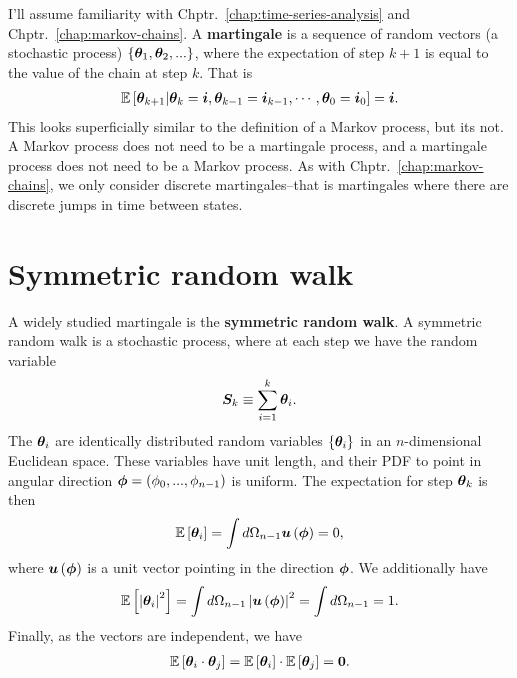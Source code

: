 
I'll assume familiarity with Chptr.~\ref{chap:time-series-analysis} and Chptr.~\ref{chap:markov-chains}.
A \textbf{martingale} is a sequence of random vectors (a stochastic process) $\left\{{\bm \theta}_1,{\bm \theta}_2,...\right\}$, where the expectation of step $k+1$ is equal to the value of the chain at step $k$.
That is
\begin{align}
    \mathbb{E}\left[{\bm \theta}_{k+1}|{\bm \theta}_{k}={\bm i},{\bm \theta}_{k-1}={\bm i}_{k-1},\cdots,{\bm \theta}_0={\bm i}_0\right]
    =
    {\bm i}
    .
\end{align}
This looks superficially similar to the definition of a Markov process, but its not.
A Markov process does not need to be a martingale process, and a martingale process does not need to be a Markov process.
As with Chptr.~\ref{chap:markov-chains}, we only consider discrete martingales--that is martingales where there are discrete jumps in time between states.

\section{Symmetric random walk\label{sec:symmetric-random-walk}}

A widely studied martingale is the \textbf{symmetric random walk}.
A symmetric random walk is a stochastic process, where at each step we have the random variable
\begin{align}
    \label{eq:def-random-walk-vector-sum}
    {\bm S}_k
    \equiv
    \sum_{i=1}^k{\bm \theta}_i
    .
\end{align}
The ${\bm \theta}_i$ are identically distributed random variables $\{{\bm \theta}_i\}$ in an $n$-dimensional Euclidean space.
These variables have unit length, and their PDF to point in angular direction ${\bm \phi}=\left(\phi_0,...,\phi_{n-1}\right)$ is uniform.
The expectation for step ${\bm \theta}_k$ is then
\begin{align}
    \mathbb{E}\left[{\bm \theta}_{i}\right]
    =
    \int d\Omega_{n-1} {\bm u}\left({\bm \phi}\right)
    =
    0
    ,
\end{align}
where ${\bm u}\left({\bm \phi}\right)$ is a unit vector pointing in the direction ${\bm \phi}$.
We additionally have
\begin{align}
    \mathbb{E}\left[\left|{\bm \theta}_i\right|^2\right]
    =
    \int d\Omega_{n-1} \left|{\bm u}\left({\bm \phi}\right)\right|^2
    =
    \int d\Omega_{n-1} 
    =
    1
    .
\end{align}
Finally, as the vectors are independent, we have
\begin{align}
    \mathbb{E}\left[{\bm \theta}_i\cdot{\bm \theta}_j\right]
    =
    \mathbb{E}\left[{\bm \theta}_i\right]
    \cdot
    \mathbb{E}\left[{\bm \theta}_j\right]
    =
    {\bm 0}
    .
\end{align}

